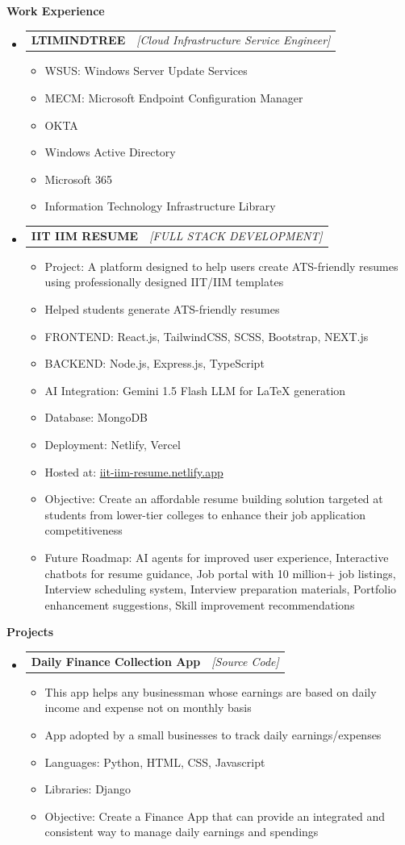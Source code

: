 \documentclass[a4paper,10pt]{article}
\makeatletter
\newcommand{\resitem}[1]{\item #1}
\newcommand{\resheading}[1]{\vspace{0.5em} {\small \colorbox{mygrey}{{\begin{minipage}{0.975\textwidth}{{\textbf{#1}}}\end{minipage}}}} \vspace{0.5em}}
\newcommand{\ressubheading}[3]{\begin{tabular*}{6.62in}{l @{\extracolsep{\fill}} r} \textbf{#1} & \textit{[#2]} \\ \end{tabular*}\vspace{-8pt}}
\makeatother
\begin{document}
\resheading{Work Experience}
\begin{itemize}
\resitem{\ressubheading{LTIMINDTREE}{Cloud Infrastructure Service Engineer}{June-Aug 2025}
\begin{itemize}
\resitem{WSUS: Windows Server Update Services}
\resitem{MECM: Microsoft Endpoint Configuration Manager}
\resitem{OKTA}
\resitem{Windows Active Directory}
\resitem{Microsoft 365}
\resitem{Information Technology Infrastructure Library}
\end{itemize}}
\resitem{\ressubheading{IIT IIM RESUME}{FULL STACK DEVELOPMENT}{Feb-May 2025}
\begin{itemize}
\resitem{Project: A platform designed to help users create ATS-friendly resumes using professionally designed IIT/IIM templates}
\resitem{Helped students generate ATS-friendly resumes}
\resitem{FRONTEND: React.js, TailwindCSS, SCSS, Bootstrap, NEXT.js}
\resitem{BACKEND: Node.js, Express.js, TypeScript}
\resitem{AI Integration: Gemini 1.5 Flash LLM for LaTeX generation}
\resitem{Database: MongoDB}
\resitem{Deployment: Netlify, Vercel}
\resitem{Hosted at: \href{https://iit-iim-resume.netlify.app}{iit-iim-resume.netlify.app}}
\resitem{Objective: Create an affordable resume building solution targeted at students from lower-tier colleges to enhance their job application competitiveness}
\resitem{Future Roadmap: AI agents for improved user experience, Interactive chatbots for resume guidance, Job portal with 10 million+ job listings, Interview scheduling system, Interview preparation materials, Portfolio enhancement suggestions, Skill improvement recommendations}
\end{itemize}}
\end{itemize}

\resheading{Projects}
\begin{itemize}
\resitem{\ressubheading{Daily Finance Collection App}{Source Code}{May ’24 - July ’24}
\begin{itemize}
\resitem{This app helps any businessman whose earnings are based on daily income and expense not on monthly basis}
\resitem{App adopted by a small businesses to track daily earnings/expenses}
\resitem{Languages: Python, HTML, CSS, Javascript}
\resitem{Libraries: Django}
\resitem{Objective: Create a Finance App that can provide an integrated and consistent way to manage daily earnings and spendings}
\end{itemize}}
\end{itemize}
\end{document}
